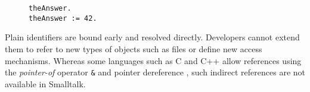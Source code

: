 \documentclass[preprint,authoryear]{llncs}
\begin{document}
\begin{figure}[htbp]
\begin{lstlisting}[style=L,label=variable-lookup,caption=Retrieve and store value via plain identifier.]
theAnswer.
theAnswer := 42.
\end{lstlisting}
\end{figure}

Plain identifiers are bound early and resolved directly.  Developers cannot extend them to refer to
new types of objects such as files or define new access mechanisms.  Whereas some languages
such as C and C++ allow references using the {\em pointer-of} operator {\tt \&} and pointer
dereference {\tt *}, such indirect references are not available in Smalltalk.








\end{document}
